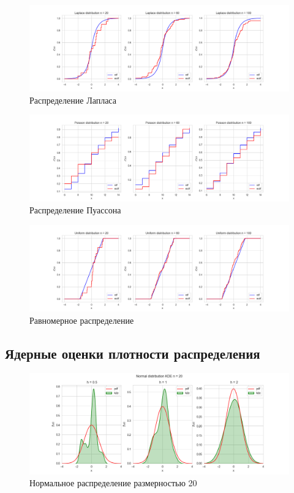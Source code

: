 \documentclass[a4paper,14pt]{article}
\begin{document}
	\begin{figure}[H]
		\centering
		\includegraphics[scale=0.48]{./lab1_4/pictures/Laplace distribution100.png}
		\caption{Распределение Лапласа}
	\end{figure}
	
	\begin{figure}[H]
		\centering
		\includegraphics[scale=0.48]{./lab1_4/pictures/Poisson distribution100.png}
		\caption{Распределение Пуассона}
	\end{figure}
	
	\begin{figure}[H]
		\centering
		\includegraphics[scale=0.48]{./lab1_4/pictures/Uniform distribution100.png}
		\caption{Равномерное распределение}
	\end{figure}
	\subsection{Ядерные оценки плотности распределения}
	\begin{figure}[H]
		\centering
		\includegraphics[scale=0.48]{./lab1_4/pictures/Normal distributionKDE20.png}
		\caption{Нормальное распределение размерностью 20}
	\end{figure}
	
\end{document}
